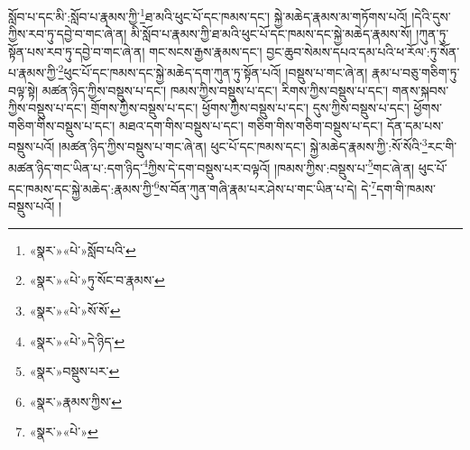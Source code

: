སློབ་པ་དང་མི་:སློབ་པ་རྣམས་ཀྱི་\footnote{«སྣར་»«པེ་»སློབ་པའི་}ཐ་མའི་ཕུང་པོ་དང་ཁམས་དང་། སྐྱེ་མཆེད་རྣམས་མ་གཏོགས་པའོ། །དེའི་དུས་ཀྱིས་རབ་ཏུ་དབྱེ་བ་གང་ཞེ་ན། མི་སློབ་པ་རྣམས་ཀྱི་ཐ་མའི་ཕུང་པོ་དང་ཁམས་དང་སྐྱེ་མཆེད་རྣམས་སོ། །ཀུན་ཏུ་སྟོན་པས་རབ་ཏུ་དབྱེ་བ་གང་ཞེ་ན། གང་སངས་རྒྱས་རྣམས་དང་། བྱང་ཆུབ་སེམས་དཔའ་དམ་པའི་ཕ་རོལ་:ཏུ་སོན་པ་རྣམས་ཀྱི་\footnote{«སྣར་»«པེ་»ཏུ་སོང་བ་རྣམས་}ཕུང་པོ་དང་ཁམས་དང་སྐྱེ་མཆེད་དག་ཀུན་ཏུ་སྟོན་པའོ། །བསྡུས་པ་གང་ཞེ་ན། རྣམ་པ་བཅུ་གཅིག་ཏུ་བལྟ་སྟེ། མཚན་ཉིད་ཀྱིས་བསྡུས་པ་དང་། ཁམས་ཀྱིས་བསྡུས་པ་དང་། རིགས་ཀྱིས་བསྡུས་པ་དང་། གནས་སྐབས་ཀྱིས་བསྡུས་པ་དང་། གྲོགས་ཀྱིས་བསྡུས་པ་དང་། ཕྱོགས་ཀྱིས་བསྡུས་པ་དང་། དུས་ཀྱིས་བསྡུས་པ་དང་། ཕྱོགས་གཅིག་གིས་བསྡུས་པ་དང་། མཐའ་དག་གིས་བསྡུས་པ་དང་། གཅིག་གིས་གཅིག་བསྡུས་པ་དང་། དོན་དམ་པས་བསྡུས་པའོ། །མཚན་ཉིད་ཀྱིས་བསྡུས་པ་གང་ཞེ་ན། ཕུང་པོ་དང་ཁམས་དང་། སྐྱེ་མཆེད་རྣམས་ཀྱི་:སོ་སོའི་\footnote{«སྣར་»«པེ་»སོ་སོ་}རང་གི་མཚན་ཉིད་གང་ཡིན་པ་:དག་ཉིད་\footnote{«སྣར་»«པེ་»དེ་ཉིད་}ཀྱིས་དེ་དག་བསྡུས་པར་བལྟའོ། །ཁམས་ཀྱིས་:བསྡུས་པ་\footnote{«སྣར་»བསྡུས་པར་}གང་ཞེ་ན། ཕུང་པོ་དང་ཁམས་དང་སྐྱེ་མཆེད་:རྣམས་ཀྱི་\footnote{«སྣར་»རྣམས་ཀྱིས་}ས་བོན་ཀུན་གཞི་རྣམ་པར་ཤེས་པ་གང་ཡིན་པ་དེ། དེ་\footnote{«སྣར་»«པེ་»}དག་གི་ཁམས་བསྡུས་པའོ། །
